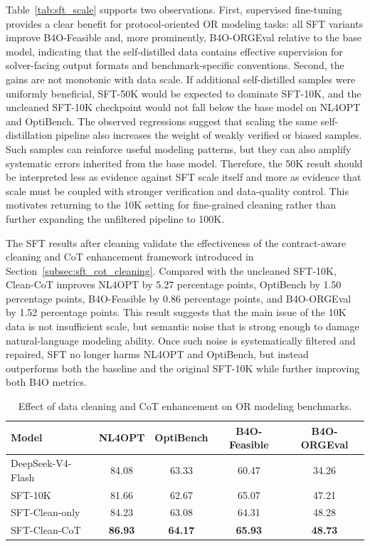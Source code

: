 Table~\ref{tab:sft_scale} supports two observations. First, supervised fine-tuning provides a clear benefit for protocol-oriented OR modeling tasks: all SFT variants improve B4O-Feasible and, more prominently, B4O-ORGEval relative to the base model, indicating that the self-distilled data contains effective supervision for solver-facing output formats and benchmark-specific conventions. Second, the gains are not monotonic with data scale. If additional self-distilled samples were uniformly beneficial, SFT-50K would be expected to dominate SFT-10K, and the uncleaned SFT-10K checkpoint would not fall below the base model on NL4OPT and OptiBench. The observed regressions suggest that scaling the same self-distillation pipeline also increases the weight of weakly verified or biased samples. Such samples can reinforce useful modeling patterns, but they can also amplify systematic errors inherited from the base model. Therefore, the 50K result should be interpreted less as evidence against SFT scale itself and more as evidence that scale must be coupled with stronger verification and data-quality control. This motivates returning to the 10K setting for fine-grained cleaning rather than further expanding the unfiltered pipeline to 100K.

The SFT results after cleaning validate the effectiveness of the contract-aware cleaning and CoT enhancement framework introduced in Section~\ref{subsec:sft_cot_cleaning}. Compared with the uncleaned SFT-10K, Clean-CoT improves NL4OPT by 5.27 percentage points, OptiBench by 1.50 percentage points, B4O-Feasible by 0.86 percentage points, and B4O-ORGEval by 1.52 percentage points. This result suggests that the main issue of the 10K data is not insufficient scale, but semantic noise that is strong enough to damage natural-language modeling ability. Once such noise is systematically filtered and repaired, SFT no longer harms NL4OPT and OptiBench, but instead outperforms both the baseline and the original SFT-10K while further improving both B4O metrics.


\begin{table}[t]
\centering
\small
\caption{Effect of data cleaning and CoT enhancement on OR modeling benchmarks.}
\begin{tabular}{lcccc}
\toprule
Model & NL4OPT & OptiBench & B4O-Feasible & B4O-ORGEval \\
\midrule
DeepSeek-V4-Flash & 84.08 & 63.33 & 60.47 & 34.26 \\
SFT-10K & 81.66 & 62.67 & 65.07 & 47.21 \\
SFT-Clean-only & 84.23 & 63.08 & 64.31 & 48.28 \\
SFT-Clean-CoT & \textbf{86.93} & \textbf{64.17} & \textbf{65.93} & \textbf{48.73} \\
\bottomrule
\end{tabular}

\label{tab:sft_cleaning}
\end{table}

